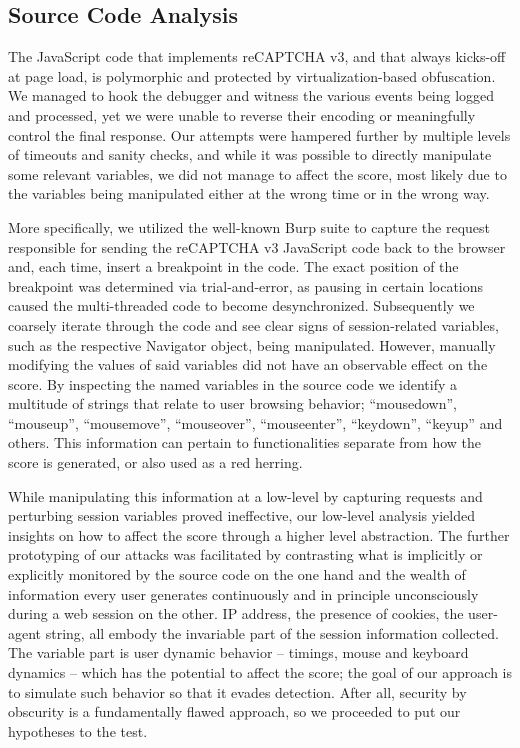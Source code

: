 \subsection{Source Code Analysis}
The JavaScript code that implements reCAPTCHA v3, and that always kicks-off at page load, is polymorphic and protected by virtualization-based obfuscation.
We managed to hook the debugger and witness the various events being logged and processed, yet we were unable to reverse their encoding or meaningfully control the final response.
Our attempts were hampered further by multiple levels of timeouts and sanity checks, and while it was possible to directly manipulate some relevant variables, we did not manage to affect the score, most likely due to the variables being manipulated either at the wrong time or in the wrong way. 

More specifically, we utilized the well-known Burp suite to capture the request responsible for sending the reCAPTCHA v3 JavaScript code back to the browser and, each time, insert a breakpoint in the code.
The exact position of the breakpoint was determined via trial-and-error, as pausing in certain locations caused the multi-threaded code to become desynchronized.
Subsequently we coarsely iterate through the code and see clear signs of session-related variables, such as the respective Navigator object, being manipulated.
However, manually modifying the values of said variables did not have an observable effect on the score. 
By inspecting the named variables in the source code we identify a multitude of strings that relate to user browsing behavior; ``mousedown'', ``mouseup'', ``mousemove'', ``mouseover'', ``mouseenter'', ``keydown'', ``keyup'' and others.
This information can pertain to functionalities separate from how the score is generated, or also used as a red herring.

While manipulating this information at a low-level by capturing requests and perturbing session variables proved ineffective, our low-level analysis yielded insights on how to affect the score through a higher level abstraction.
The further prototyping of our attacks was facilitated by contrasting what is implicitly or explicitly monitored by the source code on the one hand and the wealth of information every user generates continuously and in principle unconsciously during a web session on the other.
IP address, the presence of cookies, the user-agent string, all embody the invariable part of the session information collected.
The variable part is user dynamic behavior -- timings, mouse and keyboard dynamics -- which has the potential to affect the score; the goal of our approach is to simulate such behavior so that it evades detection.
After all, security by obscurity is a fundamentally flawed approach, so we proceeded to put our hypotheses to the test.

